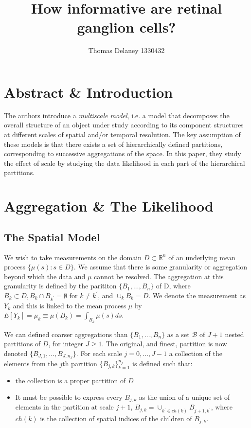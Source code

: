 \documentclass[a4paper,12pt]{article}
\title{How informative are retinal ganglion cells?}
\author{Thomas Delaney 1330432}
\theoremstyle{definition}
\begin{document}
\section{Abstract \& Introduction}
The authors introduce a \textit{multiscale model}, i.e. a model that decomposes the overall structure of an object under study according to its component structures at different scales of spatial and/or temporal resolution. The key assumption of these models is that there exists a set of hierarchically defined partitions, corresponding to successive aggregations of the space. In this paper, they study the effect of scale by studying the data likelihood in each part of the hierarchical partitions.

\section{Aggregation \& The Likelihood}
\subsection{The Spatial Model}
We wish to take measurements on the domain $D \subset \mathbb{R}^{n}$ of an underlying mean process $\{ \mu(s) : s \in D \}$. We assume that there is some granularity or aggregation beyond which the data and $\mu$ cannot be resolved. The aggregation at this granularity is defined by the parititon $\{ B_1, \dots, B_n \}$ of D, where $B_k \subset D, B_k \cap B_{k^\prime} = \emptyset$ for $k \neq k^\prime$, and $\cup_k B_k = D$. We denote the measurement as $Y_k$ and this is linked to the mean process $\mu$ by $E[Y_k] = \mu_k \equiv \mu(B_k) = \int_{B_k} \mu(s) ds$.

We can defined coarser aggregations than $\{ B_1, \dots, B_n \}$ as a set $\mathscr{B}$ of $J+1$ nested partitions of $D$, for integer $J \geq 1$. The original, and finest, partition is now denoted $\{ B_{J,1}, \dots, B_{J, n_J} \}$. For each scale $j = 0,\dots, J-1$ a collection of the elements from the $j$th partition $\{ B_{j,k} \}_{k=1}^{n_j}$ is defined such that:
\begin{itemize}
  \item the collection is a proper partition of $D$
  \item It must be possible to express every $B_{j,k}$ as the union of a unique set of elements in the partition at scale $j+1$, $B_{j,k} = \cup_{k^\prime \in ch(k)} B_{j+1,k^\prime}$, where $ch(k)$ is the collection of spatial indices of the children of $B_{j,k}$.
\end{itemize}
\end{document}

